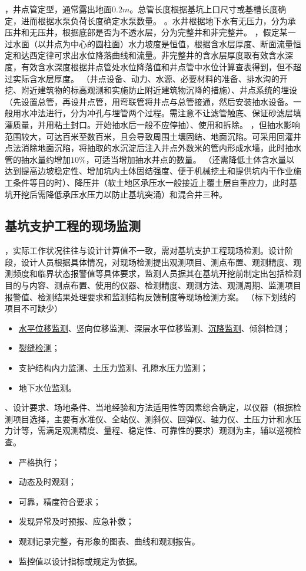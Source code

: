 \documentclass{book}
\begin{document}
，井点管定型，通常露出地面$0.2m$。总管长度根据基坑上口尺寸或基槽长度确定，进而根据水泵负荷长度确定水泵数量。
。水井根据地下水有无压力，分为承压井和无压井，根据底部是否为不透水层，分为完整井和非完整井。
，假定某一过水面（以井点为中心的圆柱面）水力坡度是恒值，根据含水层厚度、断面流量恒定和达西定律可求出水位降落曲线和流量。非完整井的含水层厚度取有效含水深度，有效含水深度根据井点管处水位降落值和井点管中水位计算查表得到，但不超过实际含水层厚度。
（井点设备、动力、水源、必要材料的准备、排水沟的开挖、附近建筑物的标高观测和实施防止附近建筑物沉降的措施）、井点系统的埋设（先设置总管，再设井点管，用弯联管将井点与总管接通，然后安装抽水设备。一般用水冲法进行，分为冲孔与埋管两个过程。需注意不让滤管触底、保证砂滤层填灌质量，并用粘土封口。开始抽水后一般不应停抽）、使用和拆除。
，但抽水影响范围较大，可达百米至数百米，且会导致周围土壤固结、地面沉陷。可采用回灌井点法消除地面沉陷，将抽取的水沉淀后注入井点外数米的管内形成水墙，此时抽水管的抽水量约增加$10\%$，可适当增加抽水井点的数量。
（还需降低土体含水量以达到提高边坡稳定性、增加坑内土体固结强度、便于机械挖土和提供坑内干作业施工条件等目的时）、降压井（软土地区承压水一般接近上覆土层自重应力，此时基坑开挖后需降低承压水压力以防止基坑突涌）和混合井三种。
\subsection{基坑支护工程的现场监测}
，实际工作状况往往与设计计算值不一致，需对基坑支护工程现场检测。设计阶段，设计人员根据具体情况，对现场检测提出观测项目、测点布置、观测精度、观测频度和临界状态报警值等具体要求，监测人员据其在基坑开挖前制定出包括检测目的与内容、测点布置、使用的仪器、检测精度、观测方法、观测周期、监测项目报警值、检测结果处理要求和监测结构反馈制度等现场检测方案。
（标下划线的项目不可缺少）
\begin{itemize}
    \item \underline{水平位移监测}、竖向位移监测、深层水平位移监测、\underline{沉降监测}、倾斜检测；
    \item \underline{裂缝检测}；
    \item 支护结构内力监测、土压力监测、孔隙水压力监测；
    \item 地下水位监测。
\end{itemize}
、设计要求、场地条件、当地经验和方法适用性等因素综合确定，以仪器（根据检测项目选择，主要有水准仪、全站仪、测斜仪、回弹仪、轴力仪、土压力计和水压力计等，需满足观测精度、量程、稳定性、可靠性的要求）观测为主，辅以巡视检查。
\begin{itemize}
    \item 严格执行；
    \item 动态及时观测；
    \item 可靠，精度符合要求；
    \item 发现异常及时预报、应急补救；
    \item 观测记录完整，有形象的图表、曲线和观测报告。
    \item 监控值以设计指标或规定为依据。
\end{itemize}
\end{document}
